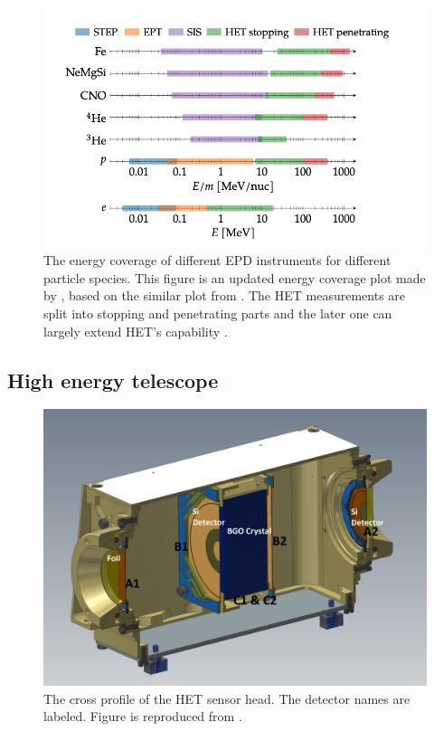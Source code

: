 \begin{figure}
    \centering
    \includegraphics[width = \textwidth]{images/EPD_coverage.png}
    \caption[The energy coverage of \ac{EPD} instruments]{The energy coverage of different \ac{EPD} instruments for different particle species. This figure is an updated energy coverage plot made by \citep{JohanPhd2020}, based on the similar plot from \citep{RodriguezPacheco-2019-EPD}. The HET measurements are split into stopping and penetrating parts and the later one can largely extend \ac{HET}'s capability \citep{Elftmann-2020-PhD}.}
    \label{Fig:EPD-energy-coverage}
\end{figure}  

\subsection{High energy telescope}

\begin{figure}
    \centering
    \includegraphics[width = \textwidth]{images/het.png}
    \caption[The \ac{HET} sensor head]{The cross profile of the \ac{HET} sensor head. The detector names are labeled. Figure is reproduced from \citet{RodriguezPacheco-2019-EPD}.}
    \label{fig:HET-sensor-head}
\end{figure}


